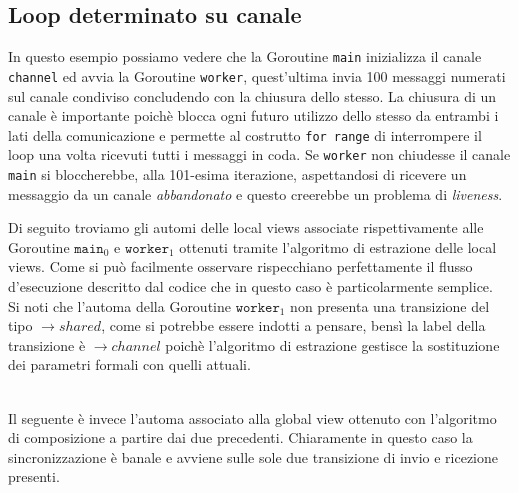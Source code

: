 \subsection{Loop determinato su canale}
In questo esempio possiamo vedere che la Goroutine \texttt{main} inizializza il canale \texttt{channel} ed avvia la Goroutine \texttt{worker}, quest'ultima invia 100 messaggi numerati sul canale condiviso concludendo con la chiusura dello stesso. La chiusura di un canale è importante poichè blocca ogni futuro utilizzo dello stesso da entrambi i lati della comunicazione e permette al costrutto \texttt{for range} di interrompere il loop una volta ricevuti tutti i messaggi in coda. Se \texttt{worker} non chiudesse il canale \texttt{main} si bloccherebbe, alla 101-esima iterazione, aspettandosi di ricevere un messaggio da un canale \emph{abbandonato} e questo creerebbe un problema di \emph{liveness}.
\newpage %

\bigskip
Di seguito troviamo gli automi delle local views associate rispettivamente alle Goroutine $\texttt{main}_0$ e $\texttt{worker}_1$ ottenuti tramite l'algoritmo di estrazione delle local views. Come si può facilmente osservare rispecchiano perfettamente il flusso d'esecuzione descritto dal codice che in questo caso è particolarmente semplice.\\
Si noti che l'automa della Goroutine $\texttt{worker}_1$ non presenta una transizione del tipo $\rightarrow shared$, come si potrebbe essere indotti a pensare, bensì la label della transizione è $  \rightarrow channel$ poichè l'algoritmo di estrazione gestisce la sostituzione dei parametri formali con quelli attuali.
\begin{figure}[h!]
    \centering
\end{figure} \bigskip \\
Il seguente è invece l'automa associato alla global view ottenuto con l'algoritmo di composizione a partire dai due precedenti. Chiaramente in questo caso la sincronizzazione è banale e avviene sulle sole due transizione di invio e ricezione presenti.
\begin{figure}[h!]
    \centering
\end{figure}



